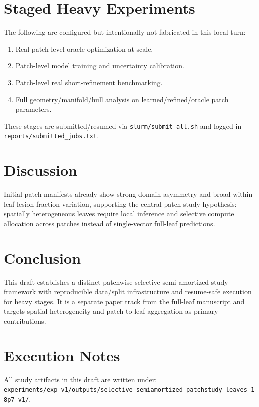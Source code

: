 \documentclass[11pt,a4paper]{article}
\begin{document}
\section{Staged Heavy Experiments}
The following are configured but intentionally not fabricated in this local turn:
\begin{enumerate}[leftmargin=*]
\item Real patch-level oracle optimization at scale.
\item Patch-level model training and uncertainty calibration.
\item Patch-level real short-refinement benchmarking.
\item Full geometry/manifold/hull analysis on learned/refined/oracle patch parameters.
\end{enumerate}
These stages are submitted/resumed via \texttt{slurm/submit\_all.sh} and logged in \texttt{reports/submitted\_jobs.txt}.

\section{Discussion}
Initial patch manifests already show strong domain asymmetry and broad within-leaf lesion-fraction variation, supporting the central patch-study hypothesis: spatially heterogeneous leaves require local inference and selective compute allocation across patches instead of single-vector full-leaf predictions.

\section{Conclusion}
This draft establishes a distinct patchwise selective semi-amortized study framework with reproducible data/split infrastructure and resume-safe execution for heavy stages. It is a separate paper track from the full-leaf manuscript and targets spatial heterogeneity and patch-to-leaf aggregation as primary contributions.




\appendix
\section{Execution Notes}
All study artifacts in this draft are written under:
\texttt{experiments/exp\_v1/outputs/selective\_semiamortized\_patchstudy\_leaves\_18p7\_v1/}.
\end{document}
